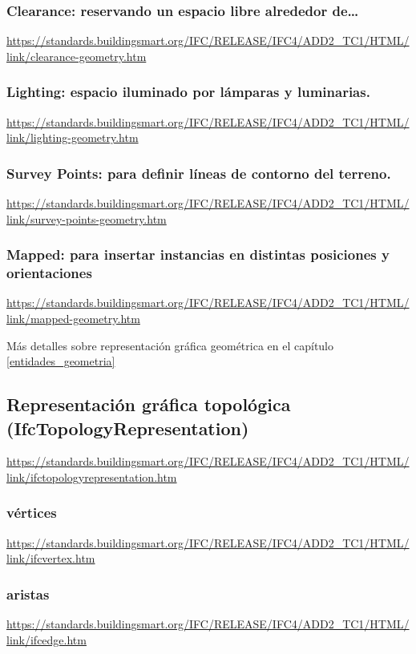 \documentclass[spanish,12pt,a4paper,final,oneside]{book}
\begin{document}
\subsubsection{Clearance: reservando un espacio libre alrededor de\ldots}
\url{https://standards.buildingsmart.org/IFC/RELEASE/IFC4/ADD2_TC1/HTML/link/clearance-geometry.htm}

\subsubsection{Lighting: espacio iluminado por lámparas y luminarias.}
\url{https://standards.buildingsmart.org/IFC/RELEASE/IFC4/ADD2_TC1/HTML/link/lighting-geometry.htm}

\subsubsection{Survey Points: para definir líneas de contorno del terreno.}
\url{https://standards.buildingsmart.org/IFC/RELEASE/IFC4/ADD2_TC1/HTML/link/survey-points-geometry.htm}

\subsubsection{Mapped: para insertar instancias en distintas posiciones y orientaciones}
\url{https://standards.buildingsmart.org/IFC/RELEASE/IFC4/ADD2_TC1/HTML/link/mapped-geometry.htm}

\vspace{0.5cm}
Más detalles sobre representación gráfica geométrica en el capítulo \ref{entidades_geometria}



\subsection{Representación gráfica topológica (IfcTopologyRepresentation)}
\url{https://standards.buildingsmart.org/IFC/RELEASE/IFC4/ADD2_TC1/HTML/link/ifctopologyrepresentation.htm}


\subsubsection{vértices}
\url{https://standards.buildingsmart.org/IFC/RELEASE/IFC4/ADD2_TC1/HTML/link/ifcvertex.htm}

\subsubsection{aristas}
\url{https://standards.buildingsmart.org/IFC/RELEASE/IFC4/ADD2_TC1/HTML/link/ifcedge.htm}
\end{document}
